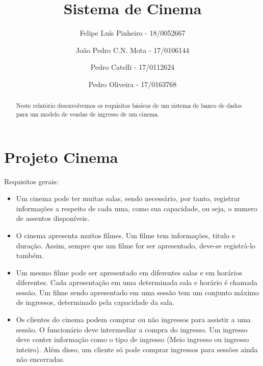 \documentclass[a4paper,10pt]{article}
\title{Sistema de Cinema}
\author{
Felipe Luís Pinheiro - 18/0052667 \and 
João Pedro C.N. Mota - 17/0106144 \and 
Pedro Catelli - 17/0112624 \and
Pedro Oliveira - 17/0163768}
\begin{document}
\maketitle

\begin{abstract}
Neste relatório desenvolvemos os requisitos básicos de um sistema de banco de dados para um modelo de vendas de ingresso de um cinema. 
\end{abstract}

\section{Projeto Cinema}

Requisitos gerais:

\begin{itemize}
	\item Um cinema pode ter muitas salas, sendo necessário, por tanto, registrar informações a respeito de cada uma, como sua capacidade, ou seja, o numero de assentos disponíveis.
	\item O cinema apresenta muitos filmes. Um filme tem informações, titulo e duração. Assim, sempre que um filme for ser apresentado, deve-se registrá-lo também.
	\item Um mesmo filme pode ser apresentado em diferentes salas e em horários diferentes. Cada apresentação em uma determinada sala e horário é chamada sessão. Um filme sendo apresentado em uma sessão tem um conjunto máximo de ingressos, determinado pela capacidade da sala.
	\item Os clientes do cinema podem comprar ou não ingressos para assistir a uma sessão. O
funcionário deve intermediar a compra do ingresso. Um ingresso deve conter informação
como o tipo de ingresso (Meio ingresso ou ingresso inteiro). Além disso, um cliente só pode
comprar ingressos para sessões ainda não encerradas.
\end{itemize}


%
% 
\end{document}
